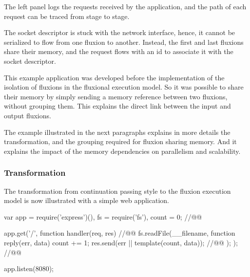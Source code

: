 The left panel logs the requests received by the application, and the path of each request can be traced from stage to stage.

The socket descriptor is stuck with the network interface, hence, it cannot be serialized to flow from one fluxion to another.
Instead, the first and last fluxions share their memory, and the request flows with an id to associate it with the socket descriptor.

This example application was developed before the implementation of the isolation of fluxions in the fluxional execution model.
So it was possible to share their memory by simply sending a memory reference between two fluxions, without grouping them.
This explains the direct link between the input and output fluxions.

The example illustrated in the next paragraphs explains in more details the transformation, and the grouping required for fluxion sharing memory.
And it explains the impact of the memory dependencies on parallelism and scalability.

\subsubsection{Transformation}

The transformation from continuation passing style to the fluxion execution model is now illustrated with a simple web application.

\begin{code}[js,
  caption={Example web application},
  label={lst:source}]
var app = require('express')(),
    fs = require('fs'),
    count = 0; //@\label{lst:source-counter}@

app.get('/', function handler(req, res){ //@\label{lst:source-handler}@
  fs.readFile(__filename, function reply(err, data) {
    count += 1;
    res.send(err || template(count, data)); //@\label{lst:source-send}@
  });
}); //@\label{lst:source-handler-end}@

app.listen(8080);
\end{code}


